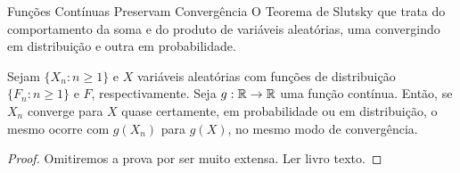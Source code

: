 \begin{frame}{Funções Contínuas Preservam Convergência}
O Teorema de Slutsky que trata do
comportamento da soma e do produto de variáveis aleatórias, uma
convergindo em distribuição e outra em probabilidade. 

\begin{teo} Sejam $\{X_n:n\geq 1\}$ e $X$ variáveis aleatórias com funções
de distribuição $\{F_n:n\geq 1\}$ e $F$, respectivamente. Seja
$g:\mathbb{R}\rightarrow\mathbb{R}$ uma função contínua. Então, se $X_n$ converge
para $X$ quase certamente, em probabilidade ou em distribuição, o
mesmo ocorre com $g(X_n)$ para $g(X)$, no mesmo modo de
convergência. \end{teo}
\begin{proof}
	Omitiremos a prova por ser muito extensa. Ler livro texto.
\end{proof}

\end{frame}
%
%
%
%
%
%
%
%
